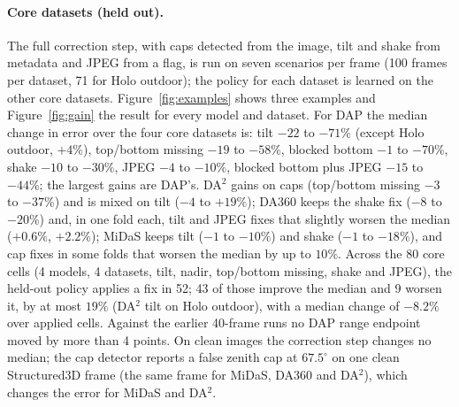 \documentclass{article}
\begin{document}
\paragraph{Core datasets (held out).} The full correction step, with caps detected from the image, tilt and shake from metadata and JPEG from a flag, is run on seven scenarios per frame (100 frames per dataset, 71 for Holo outdoor); the policy for each dataset is learned on the other core datasets. Figure~\ref{fig:examples} shows three examples and Figure~\ref{fig:gain} the result for every model and dataset. For DAP the median change in error over the four core datasets is: tilt $-22$ to $-71\%$ (except Holo outdoor, $+4\%$), top/bottom missing $-19$ to $-58\%$, blocked bottom $-1$ to $-70\%$, shake $-10$ to $-30\%$, JPEG $-4$ to $-10\%$, blocked bottom plus JPEG $-15$ to $-44\%$; the largest gains are DAP's. DA$^2$ gains on caps (top/bottom missing $-3$ to $-37\%$) and is mixed on tilt ($-4$ to $+19\%$); DA360 keeps the shake fix ($-8$ to $-20\%$) and, in one fold each, tilt and JPEG fixes that slightly worsen the median ($+0.6\%$, $+2.2\%$); MiDaS keeps tilt ($-1$ to $-10\%$) and shake ($-1$ to $-18\%$), and cap fixes in some folds that worsen the median by up to $10\%$. Across the 80 core cells (4 models, 4 datasets, tilt, nadir, top/bottom missing, shake and JPEG), the held-out policy applies a fix in 52; 43 of those improve the median and 9 worsen it, by at most $19\%$ (DA$^2$ tilt on Holo outdoor), with a median change of $-8.2\%$ over applied cells. Against the earlier 40-frame runs no DAP range endpoint moved by more than 4 points. On clean images the correction step changes no median; the cap detector reports a false zenith cap at $67.5^\circ$ on one clean Structured3D frame (the same frame for MiDaS, DA360 and DA$^2$), which changes the error for MiDaS and DA$^2$.
\end{document}

